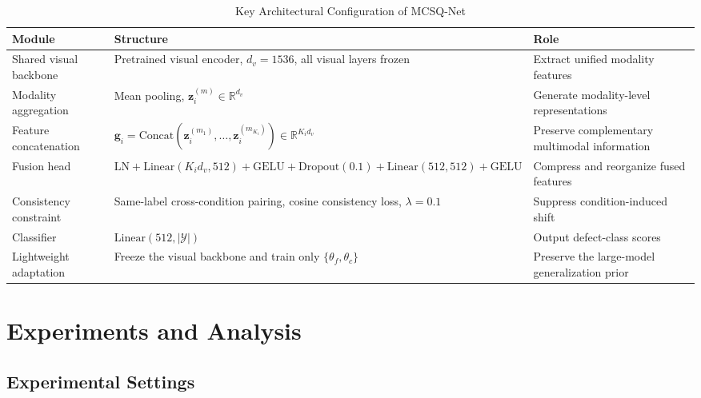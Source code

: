 \documentclass[journal]{IEEEtran}
\begin{document}
\begin{table}[!t]
\centering
\caption{Key Architectural Configuration of MCSQ-Net}
\label{tab:method_model_arch}
\footnotesize
\setlength{\tabcolsep}{4pt}
\begin{tabular*}{\textwidth}{@{\extracolsep{\fill}}>{\raggedright\arraybackslash}p{}>{\raggedright\arraybackslash}p{}>{\raggedright\arraybackslash}p{}@{}}
\toprule
Module & Structure & Role \\
\midrule
Shared visual backbone & Pretrained visual encoder, $d_v=1536$, all visual layers frozen & Extract unified modality features \\
Modality aggregation & Mean pooling, $\mathbf{z}_i^{(m)}\in\mathbb{R}^{d_v}$ & Generate modality-level representations \\
Feature concatenation & $\mathbf{g}_i=\mathrm{Concat}(\mathbf{z}_i^{(m_1)},\dots,\mathbf{z}_i^{(m_{K_i})})\in\mathbb{R}^{K_i d_v}$ & Preserve complementary multimodal information \\
Fusion head & $\mathrm{LN}+\mathrm{Linear}(K_i d_v,512)+\mathrm{GELU}+\mathrm{Dropout}(0.1)+\mathrm{Linear}(512,512)+\mathrm{GELU}$ & Compress and reorganize fused features \\
Consistency constraint & Same-label cross-condition pairing, cosine consistency loss, $\lambda=0.1$ & Suppress condition-induced shift \\
Classifier & $\mathrm{Linear}(512,|\mathcal{Y}|)$ & Output defect-class scores \\
Lightweight adaptation & Freeze the visual backbone and train only $\{\theta_f,\theta_c\}$ & Preserve the large-model generalization prior \\
\bottomrule
\end{tabular*}
\end{table}

\section{Experiments and Analysis}
\subsection{Experimental Settings}
\end{document}
